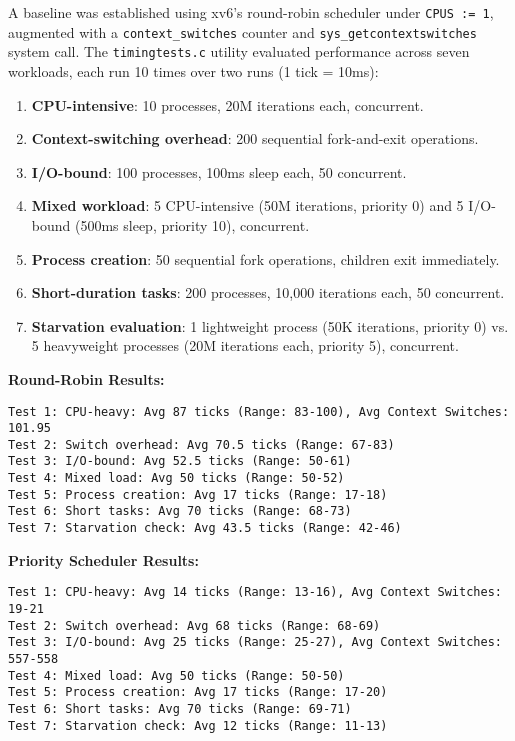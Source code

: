 \documentclass[12pt]{article}
\begin{document}
A baseline was established using xv6’s round-robin scheduler under \texttt{CPUS := 1}, augmented with a \texttt{context\_switches} counter and \texttt{sys\_getcontextswitches} system call. The \texttt{timingtests.c} utility evaluated performance across seven workloads, each run 10 times over two runs (1 tick = 10ms):

\begin{enumerate}[label=\arabic*.]
  \item \textbf{CPU-intensive}: 10 processes, 20M iterations each, concurrent.
  \item \textbf{Context-switching overhead}: 200 sequential fork-and-exit operations.
  \item \textbf{I/O-bound}: 100 processes, 100ms sleep each, 50 concurrent.
  \item \textbf{Mixed workload}: 5 CPU-intensive (50M iterations, priority 0) and 5 I/O-bound (500ms sleep, priority 10), concurrent.
  \item \textbf{Process creation}: 50 sequential fork operations, children exit immediately.
  \item \textbf{Short-duration tasks}: 200 processes, 10,000 iterations each, 50 concurrent.
  \item \textbf{Starvation evaluation}: 1 lightweight process (50K iterations, priority 0) vs. 5 heavyweight processes (20M iterations each, priority 5), concurrent.
\end{enumerate}

\textbf{Round-Robin Results:}
\begin{lstlisting}
Test 1: CPU-heavy: Avg 87 ticks (Range: 83-100), Avg Context Switches: 101.95
Test 2: Switch overhead: Avg 70.5 ticks (Range: 67-83)
Test 3: I/O-bound: Avg 52.5 ticks (Range: 50-61)
Test 4: Mixed load: Avg 50 ticks (Range: 50-52)
Test 5: Process creation: Avg 17 ticks (Range: 17-18)
Test 6: Short tasks: Avg 70 ticks (Range: 68-73)
Test 7: Starvation check: Avg 43.5 ticks (Range: 42-46)
\end{lstlisting}

\textbf{Priority Scheduler Results:}
\begin{lstlisting}
Test 1: CPU-heavy: Avg 14 ticks (Range: 13-16), Avg Context Switches: 19-21
Test 2: Switch overhead: Avg 68 ticks (Range: 68-69)
Test 3: I/O-bound: Avg 25 ticks (Range: 25-27), Avg Context Switches: 557-558
Test 4: Mixed load: Avg 50 ticks (Range: 50-50)
Test 5: Process creation: Avg 17 ticks (Range: 17-20)
Test 6: Short tasks: Avg 70 ticks (Range: 69-71)
Test 7: Starvation check: Avg 12 ticks (Range: 11-13)
\end{lstlisting}
\end{document}

